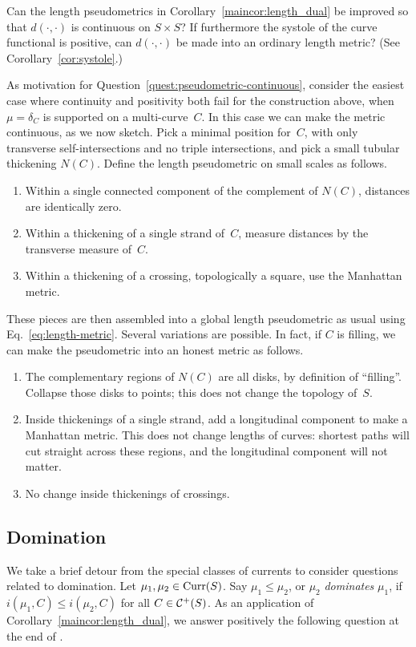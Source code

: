 \begin{question}\label{quest:pseudometric-continuous}
  Can the length pseudometrics in Corollary~\ref{maincor:length_dual}
  be improved so that $d(\cdot,\cdot)$ is continuous on $S \times S$?
  If furthermore the systole of the curve functional is positive, can
  $d(\cdot,\cdot)$ be made into an ordinary length metric? (See
  Corollary~\ref{cor:systole}.)
\end{question}

As motivation for Question~\ref{quest:pseudometric-continuous},
consider the easiest case where continuity and positivity both fail
for the construction above,
when $\mu = \delta_C$ is supported on a multi-curve~$C$. In this case
we can make the metric continuous, as we now sketch. Pick a minimal position
for~$C$, with only transverse self-intersections and no triple
intersections, and pick a small tubular thickening $N(C)$. Define the
length pseudometric on small scales as follows.
\begin{enumerate}[start=0]
\item Within a single connected component of the complement of
  $N(C)$, distances are identically zero.
\item Within a thickening of a single strand of~$C$, measure distances
  by the transverse measure of~$C$.
\item Within a thickening of a crossing, topologically a square, use
  the Manhattan metric.
\end{enumerate}
These pieces are then assembled into a global length pseudometric as
usual using Eq.~\eqref{eq:length-metric}.
Several variations are possible. In fact, if $C$ is filling, we can
make the pseudometric into an honest metric as follows.
\begin{enumerate}[start=0]
\item The complementary regions of $N(C)$ are all disks, by definition
  of ``filling''. Collapse those disks to points; this does not change
  the topology of~$S$.
\item Inside thickenings of a single strand, add a longitudinal
  component to make a Manhattan metric. This does not change lengths
  of curves: shortest paths will cut straight across these regions,
  and the longitudinal component will not matter.
\item No change inside thickenings of crossings.
\end{enumerate}

\subsection{Domination}\label{sec:domination}
We take a brief detour from the special classes of currents to
consider questions related to domination.
Let $\mu_1,\mu_2 \in \operatorname{Curr}(S)$. Say $\mu_1 \leq \mu_2$, or $\mu_2$ \emph{dominates} $\mu_1$, if $i(\mu_1,C) \leq i(\mu_2,C)$ for all $C \in \mathcal{C}^+(S)$.
As an application of Corollary~\ref{maincor:length_dual}, we answer positively the following question at the end of \cite{NC01:ShortestGeodesics}.

